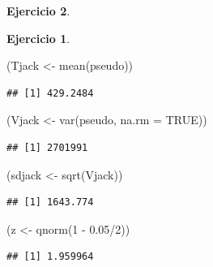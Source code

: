 \documentclass[
  12pt,
]{book}
\newenvironment{Shaded}{\begin{snugshade}}{\end{snugshade}}
\newcommand{\AttributeTok}[1]{\textcolor[rgb]{0.77,0.63,0.00}{#1}}
\newcommand{\ConstantTok}[1]{\textcolor[rgb]{0.00,0.00,0.00}{#1}}
\newcommand{\DecValTok}[1]{\textcolor[rgb]{0.00,0.00,0.81}{#1}}
\newcommand{\FloatTok}[1]{\textcolor[rgb]{0.00,0.00,0.81}{#1}}
\newcommand{\FunctionTok}[1]{\textcolor[rgb]{0.00,0.00,0.00}{#1}}
\newcommand{\NormalTok}[1]{#1}
\newcommand{\OtherTok}[1]{\textcolor[rgb]{0.56,0.35,0.01}{#1}}
\newcommand{\SpecialCharTok}[1]{\textcolor[rgb]{0.00,0.00,0.00}{#1}}
\theoremstyle{definition}
\theoremstyle{definition}
\theoremstyle{definition}
\newtheorem{exercise}{Ejercicio}[chapter]
\theoremstyle{remark}
\begin{document}
\begin{exercise}
\begin{exercise}
\protect\hypertarget{exr:unlabeled-div-39}{}\label{exr:unlabeled-div-39}

\protect\hypertarget{exr:unnamed-chunk-80}{}{\label{exr:unnamed-chunk-80} }

\end{exercise}
\end{exercise}

\begin{Shaded}
\begin{Highlighting}[]
\NormalTok{(Tjack }\OtherTok{\textless{}{-}} \FunctionTok{mean}\NormalTok{(pseudo))}
\end{Highlighting}
\end{Shaded}

\begin{verbatim}
## [1] 429.2484
\end{verbatim}

\begin{Shaded}
\begin{Highlighting}[]
\NormalTok{(Vjack }\OtherTok{\textless{}{-}} \FunctionTok{var}\NormalTok{(pseudo, }\AttributeTok{na.rm =} \ConstantTok{TRUE}\NormalTok{))}
\end{Highlighting}
\end{Shaded}

\begin{verbatim}
## [1] 2701991
\end{verbatim}

\begin{Shaded}
\begin{Highlighting}[]
\NormalTok{(sdjack }\OtherTok{\textless{}{-}} \FunctionTok{sqrt}\NormalTok{(Vjack))}
\end{Highlighting}
\end{Shaded}

\begin{verbatim}
## [1] 1643.774
\end{verbatim}

\begin{Shaded}
\begin{Highlighting}[]
\NormalTok{(z }\OtherTok{\textless{}{-}} \FunctionTok{qnorm}\NormalTok{(}\DecValTok{1} \SpecialCharTok{{-}} \FloatTok{0.05}\SpecialCharTok{/}\DecValTok{2}\NormalTok{))}
\end{Highlighting}
\end{Shaded}

\begin{verbatim}
## [1] 1.959964
\end{verbatim}
\end{document}
